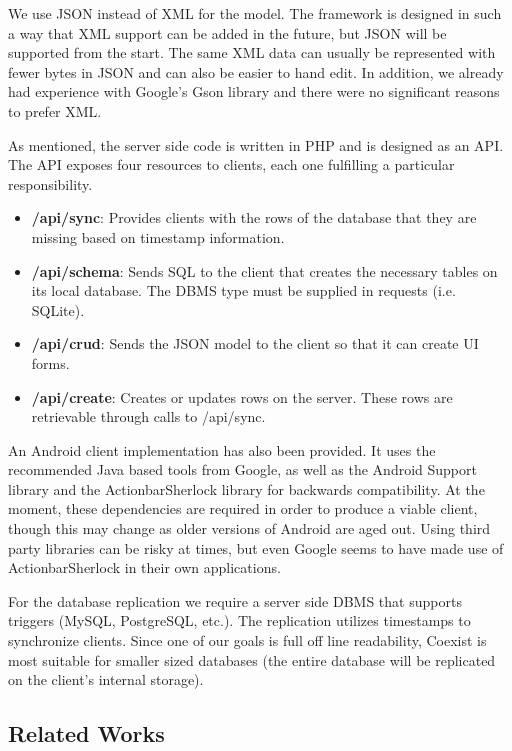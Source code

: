 \documentclass[journal]{IEEEtran}
\begin{document}
We use JSON instead of XML for the model. The framework is designed in such a way that XML support can be added in the future, but JSON will be supported from the start. The same XML data can usually be represented with fewer bytes in JSON and can also be easier to hand edit. In addition, we already had experience with Google's Gson library and there were no significant reasons to prefer XML.

As mentioned, the server side code is written in PHP and is designed as an API. The API exposes four resources to clients, each one fulfilling a particular responsibility.

\begin{itemize}
\item \textbf{/api/sync}: Provides clients with the rows of the database that they are missing based on timestamp information.
\item \textbf{/api/schema}: Sends SQL to the client that creates the necessary tables on its local database. The DBMS type must be supplied in requests (i.e. SQLite).
\item \textbf{/api/crud}: Sends the JSON model to the client so that it can create UI forms.
\item \textbf{/api/create}: Creates or updates rows on the server. These rows are retrievable through calls to /api/sync.
\end{itemize}

An Android client implementation has also been provided. It uses the recommended Java based tools from Google, as well as the Android Support library and the ActionbarSherlock library\cite{wharton_actionbarsherlock_????} for backwards compatibility. At the moment, these dependencies are required in order to produce a viable client, though this may change as older versions of Android are aged out. Using third party libraries can be risky at times, but even Google seems to have made use of ActionbarSherlock in their own applications\cite{google_baseactivity.java_????}.

For the database replication we require a server side DBMS that supports triggers (MySQL, PostgreSQL, etc.). The replication utilizes timestamps to synchronize clients. Since one of our goals is full off line readability, Coexist is most suitable for smaller sized databases (the entire database will be replicated on the client's internal storage).


\subsection{Related Works} \label{sec:related}
\end{document}
